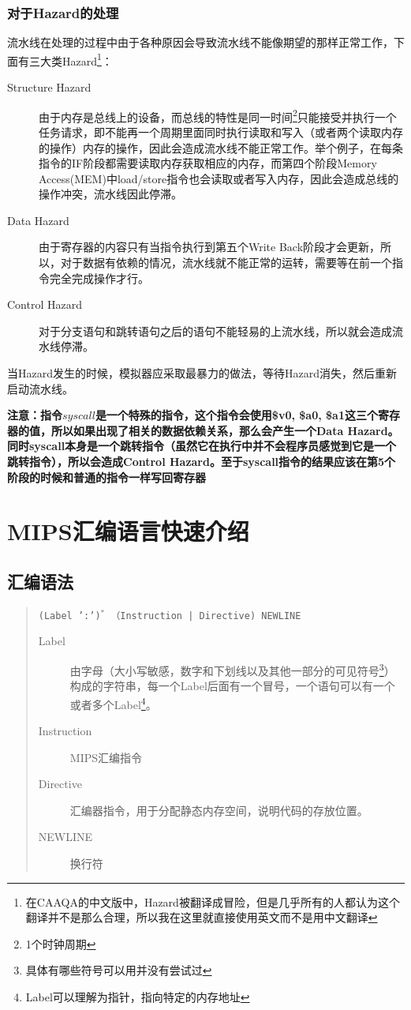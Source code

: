 \documentclass[a4paper, 11pt]{article}
\begin{document}
\subsubsection{对于Hazard的处理}
	流水线在处理的过程中由于各种原因会导致流水线不能像期望的那样正常工作，下面有三大类Hazard\footnote{在CAAQA的中文版中，Hazard被翻译成冒险，但是几乎所有的人都认为这个翻译并不是那么合理，所以我在这里就直接使用英文而不是用中文翻译}：
	\begin{description}
		\item[Structure Hazard] 由于内存是总线上的设备，而总线的特性是同一时间\footnote{1个时钟周期}只能接受并执行一个任务请求，即不能再一个周期里面同时执行读取和写入（或者两个读取内存的操作）内存的操作，因此会造成流水线不能正常工作。举个例子，在每条指令的IF阶段都需要读取内存获取相应的内存，而第四个阶段Memory Access(MEM)中load/store指令也会读取或者写入内存，因此会造成总线的操作冲突，流水线因此停滞。
		\item[Data Hazard] 由于寄存器的内容只有当指令执行到第五个Write Back阶段才会更新，所以，对于数据有依赖的情况，流水线就不能正常的运转，需要等在前一个指令完全完成操作才行。
		\item[Control Hazard] 对于分支语句和跳转语句之后的语句不能轻易的上流水线，所以就会造成流水线停滞。
	\end{description}
	当Hazard发生的时候，模拟器应采取最暴力的做法，等待Hazard消失，然后重新启动流水线。
	
	\textbf{注意：指令$ syscall $是一个特殊的指令，这个指令会使用\$v0, \$a0, \$a1这三个寄存器的值，所以如果出现了相关的数据依赖关系，那么会产生一个Data Hazard。同时syscall本身是一个跳转指令（虽然它在执行中并不会程序员感觉到它是一个跳转指令），所以会造成Control Hazard。至于syscall指令的结果应该在第5个阶段的时候和普通的指令一样写回寄存器}
\section{MIPS汇编语言快速介绍}
\subsection{汇编语法}
	\begin{quotation}
		\texttt{(Label ':')$^*$ （Instruction | Directive) NEWLINE}
		\begin{description}
			\item [Label] 由字母（大小写敏感，数字和下划线以及其他一部分的可见符号\footnote{具体有哪些符号可以用并没有尝试过}）构成的字符串，每一个Label后面有一个冒号，一个语句可以有一个或者多个Label\footnote{Label可以理解为指针，指向特定的内存地址}。
			\item [Instruction] MIPS汇编指令
			\item [Directive] 汇编器指令，用于分配静态内存空间，说明代码的存放位置。
			\item [NEWLINE] 换行符
		\end{description}
	\end{quotation}
\end{document}
